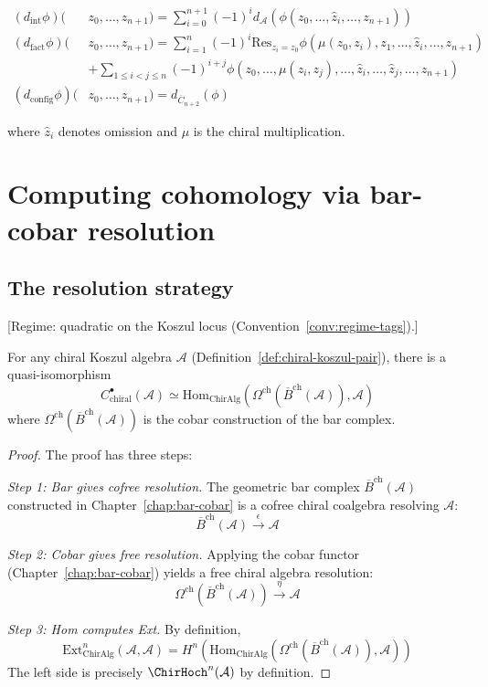 \begin{align}
(d_{\text{int}}\phi)(&z_0,\ldots,z_{n+1}) = \sum_{i=0}^{n+1} (-1)^i d_{\mathcal{A}}(\phi(z_0,\ldots,\hat{z}_i,\ldots,z_{n+1})) \\
(d_{\text{fact}}\phi)(&z_0,\ldots,z_{n+1}) = \sum_{i=1}^n (-1)^i \text{Res}_{z_i = z_0} \phi(\mu(z_0,z_i),z_1,\ldots,\hat{z}_i,\ldots,z_{n+1}) \\
&+ \sum_{1 \leq i < j \leq n} (-1)^{i+j} \phi(z_0,\ldots,\mu(z_i,z_j),\ldots,\hat{z}_i,\ldots,\hat{z}_j,\ldots,z_{n+1}) \\
(d_{\text{config}}\phi)(&z_0,\ldots,z_{n+1}) = d_{\overline{C}_{n+2}}(\phi)
\end{align}

where $\hat{z}_i$ denotes omission and $\mu$ is the chiral multiplication.

\section{Computing cohomology via bar-cobar resolution}

\subsection{The resolution strategy}

\begin{theorem}\label{thm:hochschild-bar-cobar}
\textup{[Regime: quadratic on the Koszul locus
\textup{(}Convention~\textup{\ref{conv:regime-tags})}.]}

For any chiral Koszul algebra $\mathcal{A}$
\textup{(}Definition~\textup{\ref{def:chiral-koszul-pair})},
there is a quasi-isomorphism
\[
C^{\bullet}_{\text{chiral}}(\mathcal{A}) \simeq \text{Hom}_{\text{ChirAlg}}(\Omega^{\text{ch}}(\overline{B}^{\text{ch}}(\mathcal{A})), \mathcal{A})
\]
where $\Omega^{\text{ch}}(\overline{B}^{\text{ch}}(\mathcal{A}))$ is the cobar construction of the bar complex.
\end{theorem}

\begin{proof}
The proof has three steps:

\emph{Step 1: Bar gives cofree resolution.} 
The geometric bar complex $\overline{B}^{\text{ch}}(\mathcal{A})$ constructed in Chapter~\ref{chap:bar-cobar} is a cofree chiral coalgebra resolving $\mathcal{A}$:
\[
\overline{B}^{\text{ch}}(\mathcal{A}) \xrightarrow{\epsilon} \mathcal{A}
\]

\emph{Step 2: Cobar gives free resolution.}
Applying the cobar functor (Chapter~\ref{chap:bar-cobar}) yields a free chiral algebra resolution:
\[
\Omega^{\text{ch}}(\overline{B}^{\text{ch}}(\mathcal{A})) \xrightarrow{\eta} \mathcal{A}
\]

\emph{Step 3: Hom computes Ext.}
By definition, 
\[
\text{Ext}^n_{\text{ChirAlg}}(\mathcal{A}, \mathcal{A}) = H^n(\text{Hom}_{\text{ChirAlg}}(\Omega^{\text{ch}}(\overline{B}^{\text{ch}}(\mathcal{A})), \mathcal{A}))
\]
The left side is precisely $\ChirHoch^n(\mathcal{A})$ by definition.
\end{proof}

